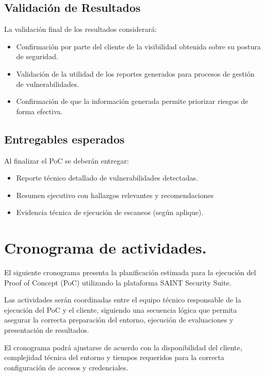 \documentclass[a4paper]{article}
\begin{document}
    \subsection{Validación de Resultados}
    La validación final de los resultados considerará:

    \begin{itemize}
        \item Confirmación por parte del cliente de la visibilidad obtenida sobre su postura de seguridad.
        \item Validación de la utilidad de los reportes generados para procesos de gestión de vulnerabilidades.
        \item Confirmación de que la información generada permite priorizar riesgos de forma efectiva.
    \end{itemize}

    \newpage

    \subsection{Entregables esperados}
    Al finalizar el PoC se deberán entregar:

    \begin{itemize}
        \item Reporte técnico detallado de vulnerabilidades detectadas.
        \item Resumen ejecutivo con hallazgos relevantes y recomendaciones
        \item Evidencia técnica de ejecución de escaneos (según aplique).
    \end{itemize}

    \section{Cronograma de actividades.}
    El siguiente cronograma presenta la planificación estimada para la ejecución del Proof of Concept (PoC) utilizando la plataforma SAINT Security Suite.

    Las actividades serán coordinadas entre el equipo técnico responsable de la ejecución del PoC y el cliente, siguiendo una secuencia lógica que permita asegurar la correcta preparación del entorno, ejecución de evaluaciones y presentación de resultados.

    El cronograma podrá ajustarse de acuerdo con la disponibilidad del cliente, complejidad técnica del entorno y tiempos requeridos para la correcta configuración de accesos y credenciales.
    
\end{document}
